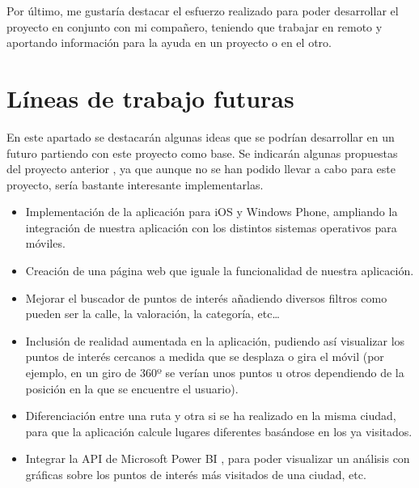 Por último, me gustaría destacar el esfuerzo realizado para poder desarrollar el proyecto en conjunto con mi compañero, teniendo que trabajar en remoto y aportando información para la ayuda en un proyecto o en el otro.

\section{Líneas de trabajo futuras}

En este apartado se destacarán algunas ideas que se podrían desarrollar en un futuro partiendo con este proyecto como base. Se indicarán algunas propuestas del proyecto anterior \cite{tfm1}, ya que aunque no se han podido llevar a cabo para este proyecto, sería bastante interesante implementarlas.

\begin{itemize}
\item Implementación de la aplicación para iOS y Windows Phone, ampliando la integración de nuestra aplicación con los distintos sistemas operativos para móviles.
\item Creación de una página web que iguale la funcionalidad de nuestra aplicación.
\item Mejorar el buscador de puntos de interés añadiendo diversos filtros como pueden ser la calle, la valoración, la categoría, etc…
\item Inclusión de realidad aumentada en la aplicación, pudiendo así visualizar los puntos de interés cercanos a medida que se desplaza o gira el móvil (por ejemplo, en un giro de 360º se verían unos puntos u otros dependiendo de la posición en la que se encuentre el usuario).
\item Diferenciación entre una ruta y otra si se ha realizado en la misma ciudad, para que la aplicación calcule lugares diferentes basándose en los ya visitados.
\item Integrar la API de Microsoft Power BI \cite{pbi}, para poder visualizar un análisis con gráficas sobre los puntos de interés más visitados de una ciudad, etc.
\end{itemize}
